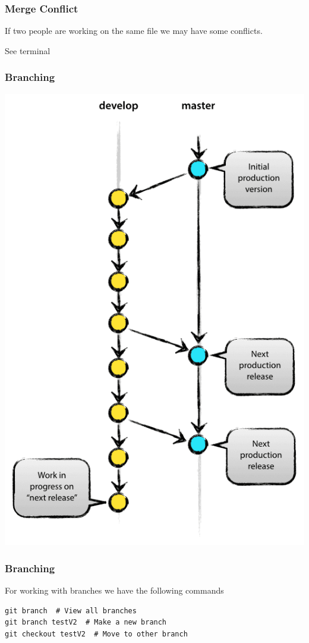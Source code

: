 \documentclass{beamer}
\begin{document}
\begin{frame}
\frametitle{Merge Conflict}
If two people are working on the same file we may have some conflicts.

See terminal
\end{frame}

\begin{frame}
\frametitle{Branching}
\centering
\includegraphics[scale = 0.25]{branching}
\end{frame}

\begin{frame}[fragile]
\frametitle{Branching}

For working with branches we have the following commands
\begin{verbatim}
git branch  # View all branches
git branch testV2  # Make a new branch
git checkout testV2  # Move to other branch 
\end{verbatim}

\end{frame}
\end{document}

